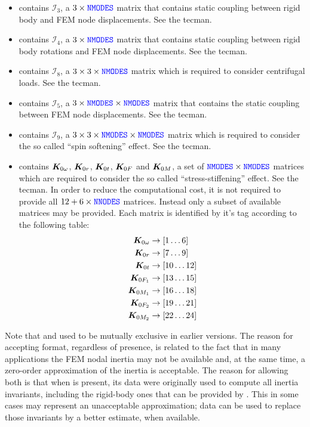 \begin{itemize}
\item {} contains $\mathcal{I}_3$, a $3 \times \textcolor{blue}{\texttt{NMODES}}$ matrix that contains static coupling between rigid body and FEM node displacements. See the tecman.
\item {} contains $\mathcal{I}_4$, a $3 \times \textcolor{blue}{\texttt{NMODES}}$ matrix that contains static coupling between rigid body rotations and FEM node displacements. See the tecman.
\item {} contains $\mathcal{I}_8$, a $3 \times 3 \times \textcolor{blue}{\texttt{NMODES}}$ matrix which is required to consider centrifugal loads. See the tecman.
\item {} contains $\mathcal{I}_5$, a $3 \times \textcolor{blue}{\texttt{NMODES}} \times \textcolor{blue}{\texttt{NMODES}}$ matrix that contains the static coupling between FEM node displacements. See the tecman.
\item {} contains $\mathcal{I}_9$, a $3 \times 3 \times \textcolor{blue}{\texttt{NMODES}} \times \textcolor{blue}{\texttt{NMODES}}$ matrix which is required to consider the so called ``spin softening'' effect. See the tecman.
\item {} contains $\boldsymbol{K}_{0\omega}$, $\boldsymbol{K}_{0r}$, $\boldsymbol{K}_{0t}$, $\boldsymbol{K}_{0F}$ and $\boldsymbol{K}_{0M}$, a set of $\textcolor{blue}{\texttt{NMODES}} \times \textcolor{blue}{\texttt{NMODES}}$ matrices which are required to consider the so called ``stress-stiffening'' effect. See the tecman. In order to reduce the computational cost, it is not required to provide all $12 + 6 \times \textcolor{blue}{\texttt{NNODES}}$ matrices. Instead only a subset of available matrices may be provided. Each matrix is identified by it's  tag according to the following table:
  \begin{align}
    \boldsymbol{K}_{0\omega}&\rightarrow\left[1\hdots6\right] \nonumber \\
    \boldsymbol{K}_{0r}&\rightarrow\left[7\hdots9\right] \nonumber \\
    \boldsymbol{K}_{0t}&\rightarrow\left[10\hdots12\right] \nonumber \\
    \boldsymbol{K}_{0F_1}&\rightarrow\left[13\hdots15\right] \nonumber \\
    \boldsymbol{K}_{0M_1}&\rightarrow\left[16\hdots18\right] \nonumber \\
    \boldsymbol{K}_{0F_2}&\rightarrow\left[19\hdots21\right] \nonumber \\
    \boldsymbol{K}_{0M_2}&\rightarrow\left[22\hdots24\right]
  \end{align}
\end{itemize}

Note that  and 
used to be mutually exclusive in earlier versions.
The reason for accepting  format,
regardless of  presence, is related
to the fact that in many applications the FEM nodal inertia
may not be available and, at the same time, a zero-order approximation
of the inertia is acceptable.
The reason for allowing both is that when 
is present, its data were originally used to compute all inertia invariants,
including the rigid-body ones that can be provided by .
This in some cases may represent an unacceptable approximation;
 data can be used to replace those invariants
by a better estimate, when available.

